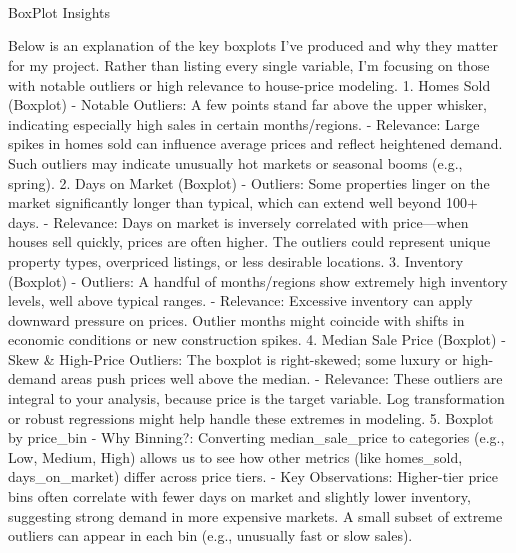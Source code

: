 \documentclass[11pt]{article}
\begin{document}
    \begin{center}
    \end{center}
    { \hspace*{\fill} \\}
    
    \begin{center}
    \end{center}
    { \hspace*{\fill} \\}
    
    \begin{center}
    \end{center}
    { \hspace*{\fill} \\}
    
    BoxPlot Insights

Below is an explanation of the key boxplots I've produced and why they
matter for my project. Rather than listing every single variable, I'm
focusing on those with notable outliers or high relevance to house-price
modeling. 1. Homes Sold (Boxplot) - Notable Outliers: A few points stand
far above the upper whisker, indicating especially high sales in certain
months/regions. - Relevance: Large spikes in homes sold can influence
average prices and reflect heightened demand. Such outliers may indicate
unusually hot markets or seasonal booms (e.g., spring). 2. Days on
Market (Boxplot) - Outliers: Some properties linger on the market
significantly longer than typical, which can extend well beyond 100+
days. - Relevance: Days on market is inversely correlated with
price---when houses sell quickly, prices are often higher. The outliers
could represent unique property types, overpriced listings, or less
desirable locations. 3. Inventory (Boxplot) - Outliers: A handful of
months/regions show extremely high inventory levels, well above typical
ranges. - Relevance: Excessive inventory can apply downward pressure on
prices. Outlier months might coincide with shifts in economic conditions
or new construction spikes. 4. Median Sale Price (Boxplot) - Skew \&
High-Price Outliers: The boxplot is right-skewed; some luxury or
high-demand areas push prices well above the median. - Relevance: These
outliers are integral to your analysis, because price is the target
variable. Log transformation or robust regressions might help handle
these extremes in modeling. 5. Boxplot by price\_bin - Why Binning?:
Converting median\_sale\_price to categories (e.g., Low, Medium, High)
allows us to see how other metrics (like homes\_sold, days\_on\_market)
differ across price tiers. - Key Observations: Higher-tier price bins
often correlate with fewer days on market and slightly lower inventory,
suggesting strong demand in more expensive markets. A small subset of
extreme outliers can appear in each bin (e.g., unusually fast or slow
sales).
\end{document}
